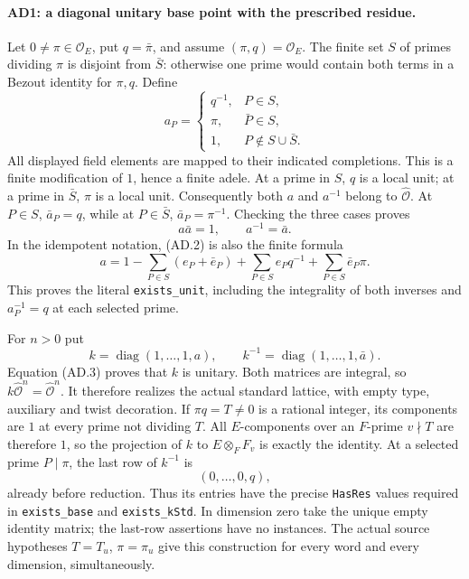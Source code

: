 \paragraph{AD1: a diagonal unitary base point with the prescribed residue.}
Let $0\ne\pi\in\mathcal O_E$, put $q=\bar\pi$, and assume
$(\pi,q)=\mathcal O_E$. The finite set $S$ of primes dividing
$\pi$ is disjoint from $\bar S$: otherwise one prime would
contain both terms in a Bezout identity for $\pi,q$.
Define
\[
 a_P=
 \begin{cases}
 q^{-1},&P\in S,\\
 \pi,&\bar P\in S,\\
 1,&P\notin S\cup\bar S.
 \end{cases}                                         \tag{AD.2}
\]
All displayed field elements are mapped to their indicated
completions. This is a finite modification of $1$, hence a finite
adele. At a prime in $S$, $q$ is a local unit; at a prime in
$\bar S$, $\pi$ is a local unit. Consequently both $a$ and
$a^{-1}$ belong to $\widehat{\mathcal O}$. At $P\in S$,
$\bar a_P=q$, while at $P\in\bar S$, $\bar a_P=\pi^{-1}$.
Checking the three cases proves
\[
                 a\bar a=1,\qquad a^{-1}=\bar a.      \tag{AD.3}
\]
In the idempotent notation, (AD.2) is also the finite formula
\[
 a=1-\sum_{P\in S}(e_P+\bar e_P)
          +\sum_{P\in S}e_Pq^{-1}
          +\sum_{P\in S}\bar e_P\pi.
\]
This proves the literal \texttt{exists\_unit}, including the
integrality of both inverses and $a_P^{-1}=q$ at each selected prime.

For $n>0$ put
\[
 k=\operatorname{diag}(1,\ldots,1,a),\qquad
 k^{-1}=\operatorname{diag}(1,\ldots,1,\bar a).        \tag{AD.4}
\]
Equation (AD.3) proves that $k$ is unitary. Both matrices are
integral, so $k\widehat{\mathcal O}^{n}=
\widehat{\mathcal O}^{n}$. It therefore realizes the actual
standard lattice, with empty type, auxiliary and twist decoration.
If $\pi q=T\ne0$ is a rational integer, its components are $1$
at every prime not dividing $T$. All $E$-components over an
$F$-prime $v\nmid T$ are therefore $1$, so the projection of
$k$ to $E\otimes_FF_v$ is exactly the identity. At a selected
prime $P\mid\pi$, the last row of $k^{-1}$ is
\[
              (0,\ldots,0,q),                       \tag{AD.5}
\]
already before reduction. Thus its entries have the precise
\texttt{HasRes} values required in \texttt{exists\_base} and
\texttt{exists\_kStd}. In dimension zero take the unique empty
identity matrix; the last-row assertions have no instances.
The actual source hypotheses $T=T_u$, $\pi=\pi_u$ give this
construction for every word and every dimension, simultaneously.


